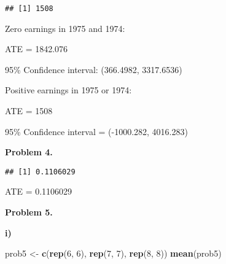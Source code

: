 \documentclass[
]{article}
\newenvironment{Shaded}{\begin{snugshade}}{\end{snugshade}}
\newcommand{\DecValTok}[1]{\textcolor[rgb]{0.00,0.00,0.81}{#1}}
\newcommand{\KeywordTok}[1]{\textcolor[rgb]{0.13,0.29,0.53}{\textbf{#1}}}
\newcommand{\NormalTok}[1]{#1}
\newcommand{\OperatorTok}[1]{\textcolor[rgb]{0.81,0.36,0.00}{\textbf{#1}}}
\newcommand{\StringTok}[1]{\textcolor[rgb]{0.31,0.60,0.02}{#1}}
\begin{document}
\begin{Shaded}
\end{Shaded}

\begin{verbatim}
## [1] 1508
\end{verbatim}

Zero earnings in 1975 and 1974:

ATE = 1842.076

95\% Confidence interval: (366.4982, 3317.6536)

Positive earnings in 1975 or 1974:

ATE = 1508

95\% Confidence interval = (-1000.282, 4016.283)

\textbf{Problem 4.}

\begin{Shaded}
\end{Shaded}

\begin{verbatim}
## [1] 0.1106029
\end{verbatim}

ATE = 0.1106029

\textbf{Problem 5.}

\textbf{i)}

\begin{Shaded}
\begin{Highlighting}[]
\NormalTok{prob5 <-}\StringTok{ }\KeywordTok{c}\NormalTok{(}\KeywordTok{rep}\NormalTok{(}\DecValTok{6}\NormalTok{, }\DecValTok{6}\NormalTok{), }\KeywordTok{rep}\NormalTok{(}\DecValTok{7}\NormalTok{, }\DecValTok{7}\NormalTok{), }\KeywordTok{rep}\NormalTok{(}\DecValTok{8}\NormalTok{, }\DecValTok{8}\NormalTok{))}
\KeywordTok{mean}\NormalTok{(prob5)}
\end{Highlighting}
\end{Shaded}
\end{document}
